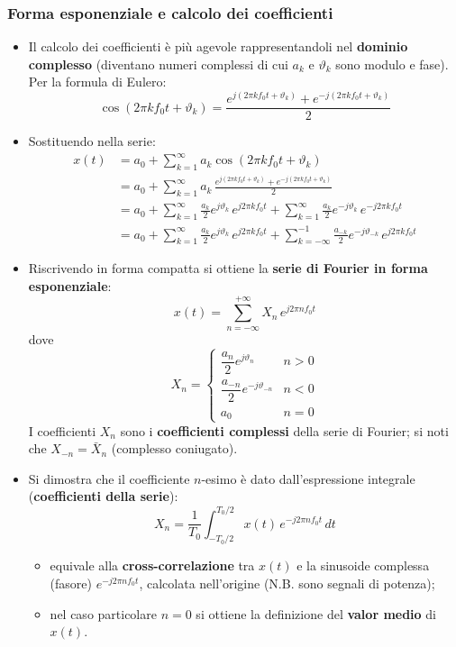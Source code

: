 \documentclass[12pt, a4paper]{article}
\begin{document}
\subsubsection{Forma esponenziale e calcolo dei coefficienti}
\begin{itemize}
    \item Il calcolo dei coefficienti è più agevole rappresentandoli nel \textbf{dominio complesso} (diventano numeri complessi di cui $a_k$ e $\vartheta_k$ sono modulo e fase). Per la formula di Eulero:
    $$\cos(2\pi kf_0t+\vartheta_k) = \frac{e^{j(2\pi kf_0t+\vartheta_k)}+e^{-j(2\pi kf_0t+\vartheta_k)}}{2}$$
    \item Sostituendo nella serie:
    \begin{align*}
        x(t) &= a_0 + \sum_{k=1}^{\infty} a_k\cos(2\pi kf_0t+\vartheta_k) \\
        &= a_0 + \sum_{k=1}^{\infty} a_k\,\frac{e^{j(2\pi kf_0t+\vartheta_k)}+e^{-j(2\pi kf_0t+\vartheta_k)}}{2} \\
        &= a_0 + \sum_{k=1}^{\infty} \frac{a_k}{2}e^{j\vartheta_k}\,e^{j2\pi kf_0t} + \sum_{k=1}^{\infty} \frac{a_k}{2}e^{-j\vartheta_k}\,e^{-j2\pi kf_0t} \\
        &= a_0 + \sum_{k=1}^{\infty} \frac{a_k}{2}e^{j\vartheta_k}\,e^{j2\pi kf_0t} + \sum_{k=-\infty}^{-1} \frac{a_{-k}}{2}e^{-j\vartheta_{-k}}\,e^{j2\pi kf_0t}
    \end{align*}
    \item Riscrivendo in forma compatta si ottiene la \textbf{serie di Fourier in forma esponenziale}:
    $$x(t) = \sum_{n=-\infty}^{+\infty} X_n\,e^{j2\pi nf_0t}$$
    dove
    $$X_n = \begin{cases} \dfrac{a_n}{2}e^{j\vartheta_n} & n>0 \\[4pt] \dfrac{a_{-n}}{2}e^{-j\vartheta_{-n}} & n<0 \\[4pt] a_0 & n=0\end{cases}$$
    I coefficienti $X_n$ sono i \textbf{coefficienti complessi} della serie di Fourier; si noti che $X_{-n}=\bar{X}_n$ (complesso coniugato).
    \item Si dimostra che il coefficiente $n$-esimo è dato dall'espressione integrale (\textbf{coefficienti della serie}):
    $$X_n = \frac{1}{T_0}\int_{-T_0/2}^{T_0/2} x(t)\,e^{-j2\pi nf_0t}\,dt$$
    \begin{itemize}
        \item equivale alla \textbf{cross-correlazione} tra $x(t)$ e la sinusoide complessa (fasore) $e^{-j2\pi nf_0t}$, calcolata nell'origine (N.B. sono segnali di potenza);
        \item nel caso particolare $n=0$ si ottiene la definizione del \textbf{valor medio} di $x(t)$.
    \end{itemize}
\end{itemize}
\end{document}
